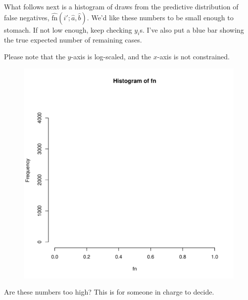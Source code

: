 \documentclass{article}
\begin{document}
\newpage
What follows next is a histogram of draws from the predictive distribution of false negatives, $\widehat{\text{fn}}(i'; \widehat{a}, \widehat{b})$. We'd like these numbers to be small enough to stomach. If not low enough, keep checking $y_i$s. I've also put a blue bar showing the true expected number of remaining cases.

Please note that the $y$-axis is log-scaled, and the $x$-axis is not constrained.

\begin{figure}[!htb]
\centering
    \includegraphics[page=2, width=.85\textwidth, trim=0cm 0cm 1cm .5cm, clip]{coverage_rankbad.pdf}
        \label{fig:figure1}
\end{figure}

Are these numbers too high? This is for someone in charge to decide.
\end{document}
